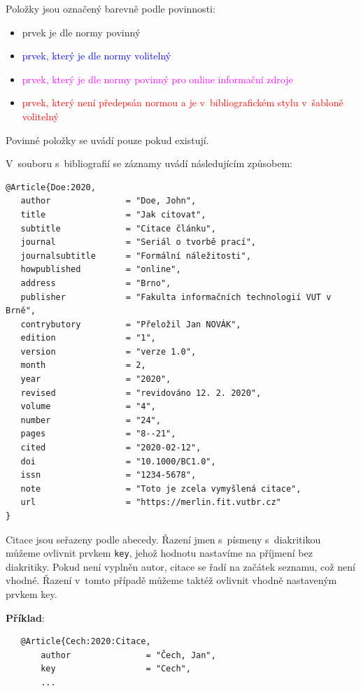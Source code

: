 \noindent Položky jsou označený barevně podle povinnosti:
\begin{itemize}
    \item prvek je dle normy povinný
    \item \textcolor{blue}{prvek, který je dle normy volitelný}
    \item \textcolor{magenta}{prvek, který je dle normy povinný pro online informační zdroje}
    \item \textcolor{red}{prvek, který není předepsán normou a je v~bibliografickém stylu v~šabloně volitelný}
\end{itemize}
Povinné položky se uvádí pouze pokud existují.

\newpage
\noindent V~souboru s~bibliografií se záznamy uvádí následujícím způsobem:
\begin{verbatim}
@Article{Doe:2020,
   author               = "Doe, John",
   title                = "Jak citovat",
   subtitle             = "Citace článku",
   journal              = "Seriál o tvorbě prací",
   journalsubtitle      = "Formální náležitosti",
   howpublished         = "online",
   address              = "Brno",
   publisher            = "Fakulta informačních technologií VUT v Brně",
   contrybutory         = "Přeložil Jan NOVÁK",
   edition              = "1",
   version              = "verze 1.0",
   month                = 2,
   year                 = "2020",
   revised              = "revidováno 12. 2. 2020",
   volume               = "4",
   number               = "24",
   pages                = "8--21",
   cited                = "2020-02-12",
   doi                  = "10.1000/BC1.0",
   issn                 = "1234-5678",
   note                 = "Toto je zcela vymyšlená citace",
   url                  = "https://merlin.fit.vutbr.cz"
}
\end{verbatim}

Citace jsou seřazeny podle abecedy. Řazení jmen s~písmeny s~diakritikou můžeme ovlivnit prvkem \texttt{key}, jehož  hodnotu nastavíme na příjmení bez diakritiky. Pokud není vyplněn autor, citace se řadí na začátek seznamu, což není vhodné. Řazení v~tomto případě můžeme taktéž ovlivnit vhodně nastaveným prvkem key.

\medskip
\medskip
\noindent \textbf{Příklad}:
\begin{verbatim}
   @Article{Cech:2020:Citace,
	   author               = "Čech, Jan",
	   key                  = "Cech",
	   ... 
\end{verbatim}


\newpage
